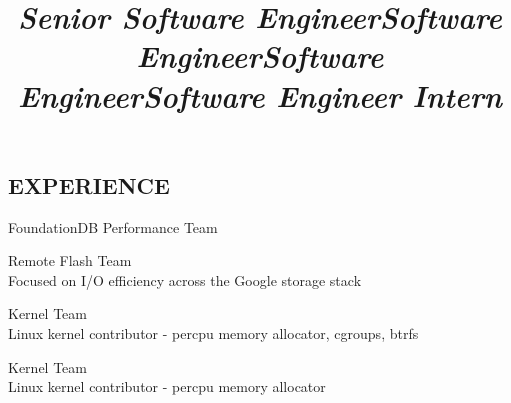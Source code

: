 \documentclass[margin,11pt]{res}
\begin{document}


\address{US Citizen}
\address{dennis@kernel.org $\bullet$ 651-442-8757}


\begin{resume}

\section{EXPERIENCE}
\title{\sl{Senior Software Engineer}}
\begin{position}
FoundationDB Performance Team
\end{position}

\title{\sl{Software Engineer}}
\begin{position}
Remote Flash Team\\
Focused on I/O efficiency across the Google storage stack
\end{position}

\title{\sl{Software Engineer}}
\begin{position}
Kernel Team\\
Linux kernel contributor - percpu memory allocator, cgroups, btrfs
\end{position}

\vspace{-24pt}
\employer{}
\location{}
\title{\sl{Software Engineer Intern}}
\begin{position}
Kernel Team\\
Linux kernel contributor - percpu memory allocator
\end{position}


\end{resume}
\end{document}
